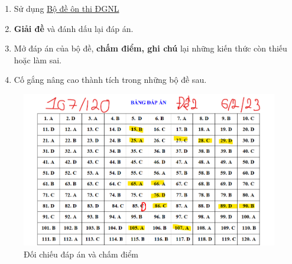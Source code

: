 \begin{enumerate}
    \item Sử dụng \href{https://drive.google.com/drive/folders/16N420tzAbo66ixWhu8H-jjBNYDrvYO4j}{Bộ đề ôn thi ĐGNL} \cite{bo_de_thidgnl}
    \item \textbf{Giải đề} và đánh dấu lại đáp án.
    \item Mở đáp án của bộ đề, \textbf{chấm điểm, ghi chú} lại những kiến thức còn thiếu hoặc làm sai. 
    \item Cố gắng nâng cao thành tích trong những bộ đề sau.
\end{enumerate}
\begin{figure}[H]
    \centering
    \includegraphics[width=1\linewidth]{img/Đề 2 -107_120.png}
    \caption{Đối chiếu đáp án và chấm điểm}
    \label{fig:giaidethu}
\end{figure}

